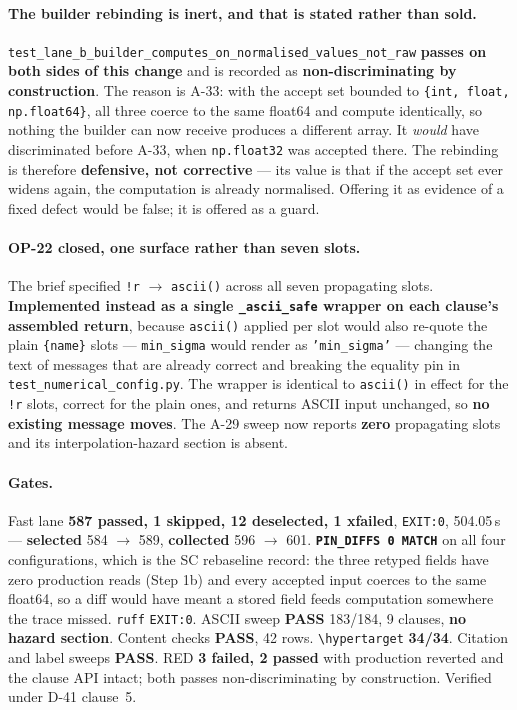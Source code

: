 \documentclass[
  10pt,
]{article}
\begin{document}
\paragraph{The builder rebinding is inert, and that is stated rather than sold.}
\texttt{test\_lane\_b\_builder\_computes\_on\_normalised\_values\_not\_raw} \textbf{passes on both sides of this change} and is recorded as \textbf{non-discriminating by construction}. The reason is A-33: with the accept set bounded to \texttt{\{int, float, np.float64\}}, all three coerce to the same float64 and compute identically, so nothing the builder can now receive produces a different array. It \emph{would} have discriminated before A-33, when \texttt{np.float32} was accepted there. The rebinding is therefore \textbf{defensive, not corrective} --- its value is that if the accept set ever widens again, the computation is already normalised. Offering it as evidence of a fixed defect would be false; it is offered as a guard.

\paragraph{OP-22 closed, one surface rather than seven slots.}
The brief specified \texttt{!r} $\rightarrow$ \texttt{ascii()} across all seven propagating slots. \textbf{Implemented instead as a single \texttt{\_ascii\_safe} wrapper on each clause's assembled return}, because \texttt{ascii()} applied per slot would also re-quote the plain \texttt{\{name\}} slots --- \texttt{min\_sigma} would render as \texttt{'min\_sigma'} --- changing the text of messages that are already correct and breaking the equality pin in \texttt{test\_numerical\_config.py}. The wrapper is identical to \texttt{ascii()} in effect for the \texttt{!r} slots, correct for the plain ones, and returns ASCII input unchanged, so \textbf{no existing message moves}. The A-29 sweep now reports \textbf{zero} propagating slots and its interpolation-hazard section is absent.

\paragraph{Gates.}
Fast lane \textbf{587 passed, 1 skipped, 12 deselected, 1 xfailed}, \texttt{EXIT:0}, 504.05\,s --- \textbf{selected} 584 $\rightarrow$ 589, \textbf{collected} 596 $\rightarrow$ 601. \textbf{\texttt{PIN\_DIFFS 0 MATCH}} on all four configurations, which is the SC rebaseline record: the three retyped fields have zero production reads (Step 1b) and every accepted input coerces to the same float64, so a diff would have meant a stored field feeds computation somewhere the trace missed. \texttt{ruff} \texttt{EXIT:0}. ASCII sweep \textbf{PASS} 183/184, 9 clauses, \textbf{no hazard section}. Content checks \textbf{PASS}, 42 rows. \texttt{\textbackslash hypertarget} \textbf{34/34}. Citation and label sweeps \textbf{PASS}. RED \textbf{3 failed, 2 passed} with production reverted and the clause API intact; both passes non-discriminating by construction. Verified under D-41 clause~5.
\end{document}

